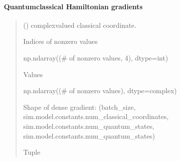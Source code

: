 \documentclass[letterpaper,10pt,english]{sphinxmanual}
\begin{document}
\paragraph{Quantum\sphinxhyphen{}classical Hamiltonian gradients}
\label{\detokenize{user_guide/defaults:quantum-classical-hamiltonian-gradients}}

\begin{fulllineitems}
\label{\detokenize{user_guide/defaults:id0}}
\pysigstartsignatures
\pysiglinewithargsret
{}
{\sphinxparamcomma {}\sphinxparamcomma {}\sphinxparamcomma {}}
{}
\pysigstopsignatures\begin{quote}\begin{description}
\sphinxAtStartPar
{} (\sphinxstyleliteralemphasis{\sphinxupquote{(}}\sphinxstyleliteralemphasis{\sphinxupquote{(}}\sphinxstyleliteralemphasis{\sphinxupquote{, }}\sphinxstyleliteralemphasis{\sphinxupquote{)}}\sphinxstyleliteralemphasis{\sphinxupquote{, }}\sphinxstyleliteralemphasis{\sphinxupquote{)}}) \textendash{} complex\sphinxhyphen{}valued classical coordinate.

\sphinxAtStartPar
Indices of nonzero values

\sphinxAtStartPar
np.ndarray((\# of nonzero values, 4), dtype=int)

\sphinxAtStartPar
Values

\sphinxAtStartPar
np.ndarray((\# of nonzero values), dtype=complex)

\sphinxAtStartPar
Shape of dense gradient: (batch\_size, sim.model.constants.num\_classical\_coordinates, sim.model.constants.num\_quantum\_states, sim.model.constants.num\_quantum\_states)

\sphinxAtStartPar
Tuple

\end{description}\end{quote}

\end{fulllineitems}
\end{document}
